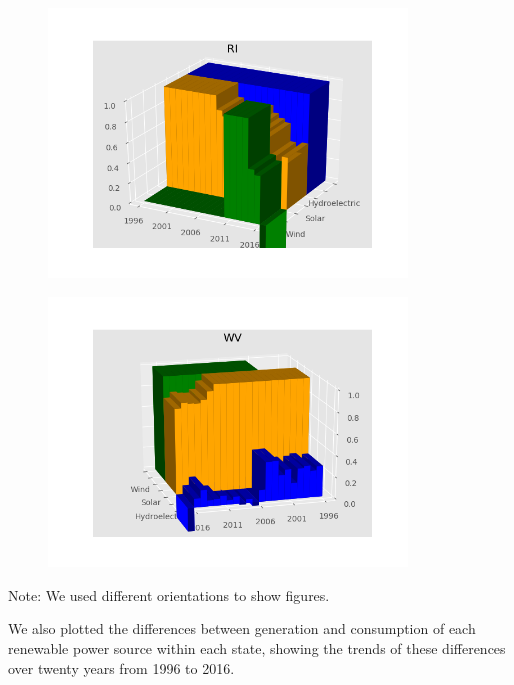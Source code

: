 \documentclass[12pt]{article}
\begin{document}
\begin{figure}[!htbp]
\centering
\includegraphics[width=0.85\textwidth]{RI.png}
\end{figure}

\begin{figure}[!htbp]
\centering
\includegraphics[width=0.85\textwidth]{WV.png}
\end{figure}

\newpage
Note: We used different orientations to show figures.

We also plotted the differences between generation and consumption of each renewable power source within each state, showing the trends of these differences over twenty years from 1996 to 2016. 
\end{document}
